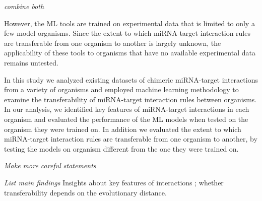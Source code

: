 \documentclass{bmcart}
\begin{document}
\textit{combine both}

However, the ML tools are trained on experimental data that is limited to only a few model organisms. Since the extent to which miRNA-target interaction rules are transferable from one organism to another is largely unknown, the applicability of these tools to organisms that have no available experimental data remains untested. 

In this study we analyzed existing datasets of chimeric miRNA-target interactions from a variety of organisms and employed machine learning methodology to examine the transferability of miRNA-target interaction rules between organisms. 
In our analysis, we identified key features of miRNA-target interactions in each organism and evaluated the performance of the ML models when tested on the organism they were trained on. In addition we evaluated the extent to which miRNA-target interaction rules are transferable from one organism to another, by testing the models on organism different from the one they were trained on. 

\textit{Make more careful statements}

\textit{List main findings}
Insights about key features of interactions ; 
whether transferability depends on the evolutionary distance. 
\end{document}
